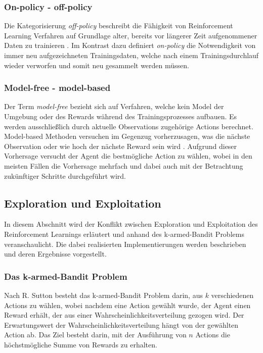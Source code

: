 \documentclass[11pt]{scrartcl}
\begin{document}
\subsubsection{On-policy - off-policy}
Die Kategorisierung \textit{off-policy} beschreibt die Fähigkeit von Reinforcement Learning Verfahren auf
Grundlage alter, bereits vor längerer Zeit aufgenommener Daten zu trainieren \cite[~S.78 f.]{L2018}. 
Im Kontrast dazu definiert \textit{on-policy} die Notwendigkeit von immer neu aufgezeichneten 
Trainingsdaten, welche nach einem Trainingsdurchlauf wieder verworfen und somit neu gesammelt
werden müssen.


\subsubsection{Model-free - model-based}
Der Term \textit{model-free} bezieht sich auf Verfahren, welche kein Model der Umgebung oder des Rewards
während des Trainingsprozesses aufbauen. Es werden ausschließlich durch aktuelle Observations
zugehörige Actions berechnet. Model-based Methoden versuchen im Gegenzug vorherzusagen, was 
die nächste Observation oder wie hoch der nächste Reward sein wird \cite[~S.78 f.]{L2018}. Aufgrund dieser
Vorhersage versucht der Agent die bestmögliche Action zu wählen, wobei in den meisten
Fällen die Vorhersage mehrfach und dabei auch mit der Betrachtung zukünftiger Schritte durchgeführt
wird.


\subsection{Exploration und Exploitation}
In diesem Abschnitt wird der Konflikt zwischen Exploration und Exploitation des
Reinforcement Learnings erläutert und anhand des k-armed-Bandit Problems veranschaulicht.
Die dabei realisierten Implementierungen werden beschrieben und deren Ergebnisse
vorgestellt.


\subsubsection{Das k-armed-Bandit Problem}
Nach R. Sutton \cite[~S.26]{SB1998} besteht das k-armed-Bandit Problem darin, aus $k$
verschiedenen Actions zu wählen, wobei nachdem eine Action gewählt wurde, der Agent einen
Reward erhält, der aus einer Wahrscheinlichkeitsverteilung gezogen wird. Der
Erwartungswert der Wahrscheinlichkeitsverteilung hängt von der gewählten Action ab. Das
Ziel besteht darin, mit der Ausführung von $n$ Actions die höchstmögliche Summe von Rewards
zu erhalten.
\end{document}

